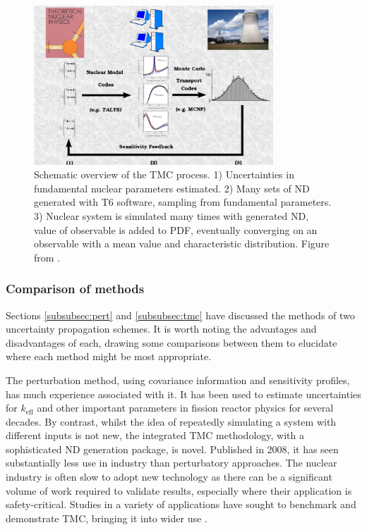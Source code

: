 \begin{figure}
  \centering
  \includegraphics[width=0.8\textwidth]{tmc_overview.png}
  \caption[Total Monte Carlo process schematic.]{Schematic overview of the TMC process. 1) Uncertainties in fundamental nuclear parameters estimated. 2) Many sets of ND generated with T6 software, sampling from fundamental parameters. 3) Nuclear system is simulated many times with generated ND, value of observable is added to PDF, eventually converging on an observable with a mean value and characteristic distribution. Figure from \cite{Koning2008}.}
  \label{fig:tmc_overview}
\end{figure}

\FloatBarrier
\subsubsection{Comparison of methods}
Sections \ref{subsubsec:pert} and \ref{subsubsec:tmc} have discussed the methods of two uncertainty propagation schemes. It is worth noting the advantages and disadvantages of each, drawing some comparisons between them to elucidate where each method might be most appropriate.

The perturbation method, using covariance information and sensitivity profiles, has much experience associated with it. It has been used to estimate uncertainties for $k_\mathrm{eff}$ and other important parameters in fission reactor physics for several decades. By contrast, whilst the idea of repeatedly simulating a system with different inputs is not new, the integrated TMC methodology, with a sophisticated ND generation package, is novel. Published in 2008, it has seen substantially less use in industry than perturbatory approaches. The nuclear industry is often slow to adopt new technology as there can be a significant volume of work required to validate results, especially where their application is safety-critical. Studies in a variety of applications have sought to benchmark and demonstrate TMC, bringing it into wider use \cite{Koning2008}\cite{Rochman2010}\cite{Sjostrand2017}\cite{Koning2012}\cite{Alhassan2013}\cite{Alhassan2014}\cite{Rochman2011a}. 

